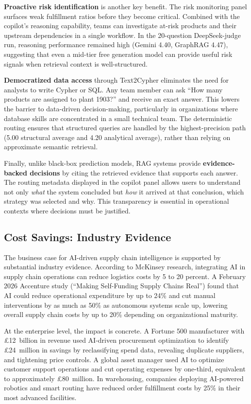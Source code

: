 \documentclass[11pt,a4paper]{article}
\begin{document}
\textbf{Proactive risk identification} is another key benefit. The risk monitoring panel surfaces weak fulfillment ratios before they become critical. Combined with the copilot's reasoning capability, teams can investigate at-risk products and their upstream dependencies in a single workflow. In the 20-question DeepSeek-judge run, reasoning performance remained high (Gemini 4.40, GraphRAG 4.47), suggesting that even a mid-tier free generation model can provide useful risk signals when retrieval context is well-structured.

\textbf{Democratized data access} through Text2Cypher eliminates the need for analysts to write Cypher or SQL. Any team member can ask ``How many products are assigned to plant 1903?'' and receive an exact answer. This lowers the barrier to data-driven decision-making, particularly in organizations where database skills are concentrated in a small technical team. The deterministic routing ensures that structured queries are handled by the highest-precision path (5.00 structural average and 4.20 analytical average), rather than relying on approximate semantic retrieval.

Finally, unlike black-box prediction models, RAG systems provide \textbf{evidence-backed decisions} by citing the retrieved evidence that supports each answer. The routing metadata displayed in the copilot panel allows users to understand not only \textit{what} the system concluded but \textit{how} it arrived at that conclusion, which strategy was selected and why. This transparency is essential in operational contexts where decisions must be justified.

\subsection{Cost Savings: Industry Evidence}

The business case for AI-driven supply chain intelligence is supported by substantial industry evidence. According to McKinsey research, integrating AI in supply chain operations can reduce logistics costs by 5 to 20 percent. A February 2026 Accenture study (``Making Self-Funding Supply Chains Real'') found that AI could reduce operational expenditure by up to 24\% and cut manual interventions by as much as 50\% as autonomous systems scale up, lowering overall supply chain costs by up to 20\% depending on organizational maturity.

At the enterprise level, the impact is concrete. A Fortune 500 manufacturer with \pounds12~billion in revenue used AI-driven procurement optimization to identify \pounds24~million in savings by reclassifying spend data, revealing duplicate suppliers, and tightening price controls. A global asset manager used AI to optimize customer support operations and cut operating expenses by one-third, equivalent to approximately \pounds80~million. In warehousing, companies deploying AI-powered robotics and smart routing have reduced order fulfillment costs by 25\% in their most advanced facilities.
\end{document}

